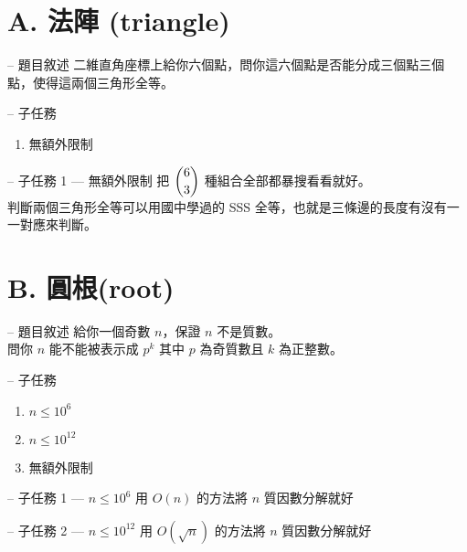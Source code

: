 \documentclass[hyperref,UTF8,notheorems,xcolor={dvipsnames}]{beamer}
\newcommand{\btitle}[1]{{\secname} -- #1}
\theoremstyle{definition}
\begin{document}
\section{A. 法陣 (triangle)}

\begin{frame}[fragile]{\btitle{題目敘述}}
	二維直角座標上給你六個點，問你這六個點是否能分成三個點三個點，使得這兩個三角形全等。
\end{frame}

\begin{frame}[fragile]{\btitle{子任務}}
	\begin{enumerate}
		\item 無額外限制
	\end{enumerate}
\end{frame}

\begin{frame}[fragile]{\btitle{子任務 1 --- 無額外限制}}
	 把 $\dbinom{6}{3}$ 種組合全部都暴搜看看就好。 \\
	 
	 判斷兩個三角形全等可以用國中學過的 SSS 全等，也就是三條邊的長度有沒有一一對應來判斷。
\end{frame}

\section{B. 圓根(root)}

\begin{frame}[fragile]{\btitle{題目敘述}}
	給你一個奇數 $n$，保證 $n$ 不是質數。 \\
	問你 $n$ 能不能被表示成 $p^k$ 其中 $p$ 為奇質數且 $k$ 為正整數。
\end{frame}

\begin{frame}[fragile]{\btitle{子任務}}
	\begin{enumerate}
		\item $n \le 10^6$
		\item $n \le 10^{12}$
		\item 無額外限制
	\end{enumerate}
\end{frame}

\begin{frame}[fragile]{\btitle{子任務 1 --- $n \le 10^6$}}
	用 $O(n)$ 的方法將 $n$ 質因數分解就好
\end{frame}

\begin{frame}[fragile]{\btitle{子任務 2 --- $n \le 10^{12}$}}
	用 $O(\sqrt{n})$ 的方法將 $n$ 質因數分解就好
\end{frame}
\end{document}
